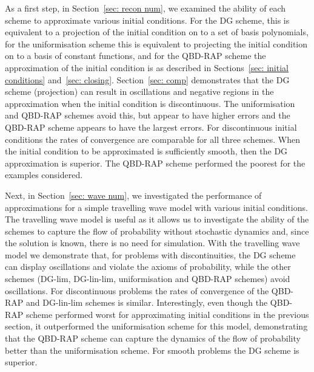 As a first step, in Section~\ref{sec: recon num}, we examined the ability of each scheme to approximate various initial conditions. For the DG scheme, this is equivalent to a projection of the initial condition on to a set of basis polynomials, for the uniformisation scheme this is equivalent to projecting the initial condition on to a basis of constant functions, and for the QBD-RAP scheme the approximation of the initial condition is as described in Sections~\ref{sec: initial conditions} and~\ref{sec: closing}. Section~\ref{sec: comp} demonstrates that the DG scheme (projection) can result in oscillations and negative regions in the approximation when the initial condition is discontinuous. The uniformisation and QBD-RAP schemes avoid this, but appear to have higher errors and the QBD-RAP scheme appears to have the largest errors. For discontinuous initial conditions the rates of convergence are comparable for all three schemes. When the initial condition to be approximated is sufficiently smooth, then the DG approximation is superior. The QBD-RAP scheme performed the poorest for the examples considered. %

Next, in Section~\ref{sec: wave num}, we investigated the performance of approximations for a simple travelling wave model with various initial conditions. The travelling wave model is useful as it allows us to investigate the ability of the schemes to capture the flow of probability without stochastic dynamics and, since the solution is known, there is no need for simulation. With the travelling wave model we demonstrate that, for problems with discontinuities, the DG scheme can display oscillations and violate the axioms of probability, while the other schemes (DG-lim, DG-lin-lim, uniformisation and QBD-RAP schemes) avoid oscillations. For discontinuous problems the rates of convergence of the QBD-RAP and DG-lin-lim schemes is similar. Interestingly, even though the QBD-RAP scheme performed worst for approximating initial conditions in the previous section, it outperformed the uniformisation scheme for this model, demonstrating that the QBD-RAP scheme can capture the dynamics of the flow of probability better than the uniformisation scheme. For smooth problems the DG scheme is superior.


